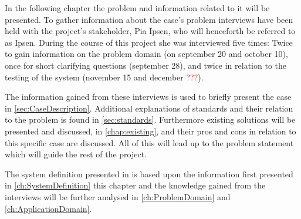 In the following chapter the problem and information related to it will be presented.
To gather information about the case's problem interviews have been held with the project's stakeholder, Pia Ipsen, who will henceforth be referred to as Ipsen. 
During the course of this project she was interviewed five times: 
Twice to gain information on the problem domain (on september 20 and october 10),
once for short clarifying questions (september 28),
and twice in relation to the testing of the system (november 15 and december \textcolor{red}{???}).

The information gained from these interviews is used to briefly present the case in \cref{sec:CaseDescription}. 
Additional explanations of standards and their relation to the problem is found in \cref{sec:standards}.
Furthermore existing solutions will be presented and discussed, in \cref{chap:existing}, and their pros and cons in relation to this specific case are discussed.
All of this will lead up to the problem statement which will guide the rest of the project.

The system definition presented in  is based upon the information first presented in \cref{ch:SystemDefinition} this chapter and the knowledge gained from the interviews will be further analysed in \cref{ch:ProblemDomain} and \cref{ch:ApplicationDomain}.